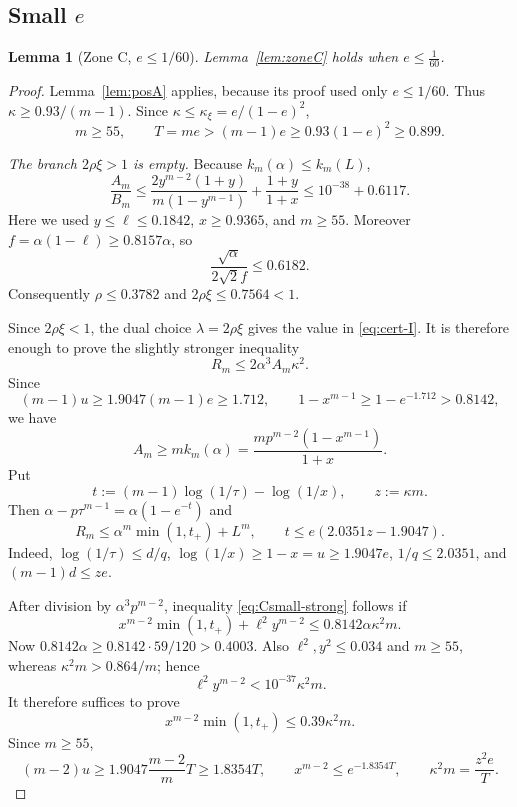 \documentclass[11pt]{article}
\newtheorem{lemma}[theorem]{Lemma}
\begin{document}
\subsection{Small \texorpdfstring{$e$}{e}}

\begin{lemma}[Zone C, $e\le1/60$]\label{lem:zoneC-small}
Lemma~\ref{lem:zoneC} holds when $e\le\tfrac1{60}$.
\end{lemma}

\begin{proof}
Lemma~\ref{lem:posA} applies, because its proof used only $e\le1/60$.
Thus $\kappa\ge0.93/(m-1)$.  Since
$\kappa\le\kappa_\xi=e/(1-e)^2$,
\begin{equation}\label{eq:C-mT}
        m\ge55,
        \qquad
        T=me>(m-1)e\ge0.93(1-e)^2\ge0.899.
\end{equation}

\emph{The branch $2\rho\xi>1$ is empty.}
Because $k_m(\alpha)\le k_m(L)$,
\[
 \frac{A_m}{B_m}
 \le\frac{2y^{m-2}(1+y)}{m(1-y^{m-1})}
     +\frac{1+y}{1+x}
 \le10^{-38}+0.6117.
\]
Here we used $y\le\ell\le0.1842$, $x\ge0.9365$, and $m\ge55$.
Moreover $f=\alpha(1-\ell)\ge0.8157\alpha$, so
\[
 \frac{\sqrt\alpha}{2\sqrt2f}\le0.6182.
\]
Consequently $\rho\le0.3782$ and
$2\rho\xi\le0.7564<1$.

Since $2\rho\xi<1$, the dual choice $\lambda=2\rho\xi$ gives the value in
\eqref{eq:cert-I}.  It is therefore enough to prove the slightly stronger
inequality
\begin{equation}\label{eq:Csmall-strong}
        R_m\le2\alpha^3A_m\kappa^2.
\end{equation}
Since
\[
 (m-1)u\ge1.9047(m-1)e\ge1.712,
 \qquad
 1-x^{m-1}\ge1-e^{-1.712}>0.8142,
\]
we have
\[
 A_m\ge m k_m(\alpha)
 =\frac{m p^{m-2}(1-x^{m-1})}{1+x}.
\]
Put
\[
 t:=(m-1)\log(1/\tau)-\log(1/x),
 \qquad z:=\kappa m.
\]
Then $\alpha-p\tau^{m-1}=\alpha(1-e^{-t})$ and
\begin{equation}\label{eq:Csmall-t}
 R_m\le\alpha^m\min(1,t_+)+L^m,
 \qquad
 t\le e(2.0351z-1.9047).
\end{equation}
Indeed,
$\log(1/\tau)\le d/q$, $\log(1/x)\ge1-x=u\ge1.9047e$,
$1/q\le2.0351$, and $(m-1)d\le ze$.

After division by $\alpha^3p^{m-2}$, inequality
\eqref{eq:Csmall-strong} follows if
\begin{equation}\label{eq:Csmall-normalized}
 x^{m-2}\min(1,t_+)+\ell^2y^{m-2}
 \le0.8142\alpha\kappa^2m.
\end{equation}
Now $0.8142\alpha\ge0.8142\cdot59/120>0.4003$.  Also
$\ell^2,y^2\le0.034$ and $m\ge55$, whereas
$\kappa^2m>0.864/m$; hence
\[
        \ell^2y^{m-2}<10^{-37}\kappa^2m.
\]
It therefore suffices to prove
\begin{equation}\label{eq:C-battle}
        x^{m-2}\min(1,t_+)\le0.39\kappa^2m.
\end{equation}
Since $m\ge55$,
\[
 (m-2)u\ge1.9047\frac{m-2}{m}T\ge1.8354T,
 \qquad
 x^{m-2}\le e^{-1.8354T},
 \qquad
 \kappa^2m=\frac{z^2e}{T}.
\]


\end{proof}
\end{document}
